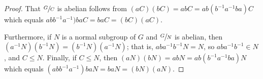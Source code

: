\documentclass[a4paper,11pt]{article}
\begin{document}
\begin{outline}
\begin{proof}
      That \(\sfrac{G}{C}\) is abelian follows from \((aC)(bC) = abC = ab(b^{-1}a^{-1}ba)C\) which equals 
      \(abb^{-1}a^{-1})baC = baC = (bC)(aC).\) 
      
      Furthermore, if \(N\) is a normal subgroup of \(G\) and \(\sfrac{G}{N}\) is abelian, then 
      \((a^{-1}N)(b^{-1}N) = (b^{-1}N)(a^{-1}N)\); that is, \(aba^{-1}b^{-1}N = N\), so \(aba^{-1}b^{-1} \in N\), 
      and \(C \leq N\). Finally, if \(C \leq N\), then \((aN)(bN) = abN = ab(b^{-1}a^{-1}ba)N\) which equals 
      \((abb^{-1}a^{-1})baN = baN = (bN)(aN).\)
    \end{proof}
      
\end{outline}
\end{document}

